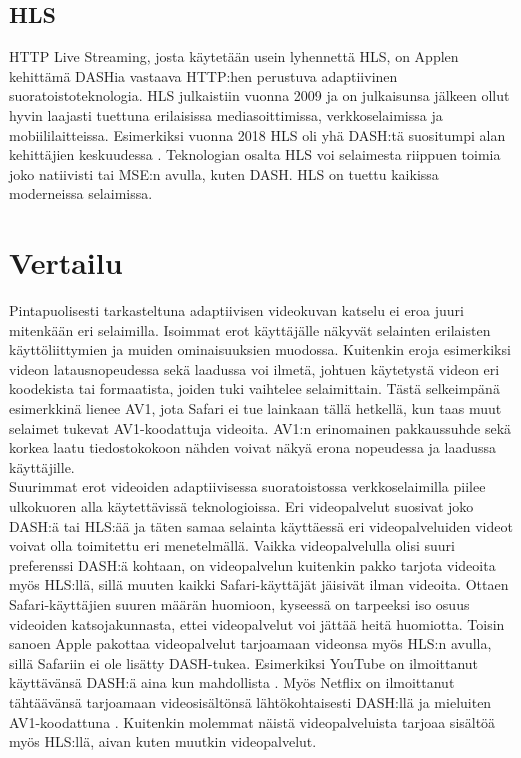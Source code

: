 \documentclass[finnish, 12pt, a4paper, elec, utf8, a-1b, online]{aaltothesis}
\begin{document}
\subsection*{HLS}

HTTP Live Streaming, josta käytetään usein lyhennettä HLS, on Applen kehittämä DASHia vastaava HTTP:hen perustuva adaptiivinen suoratoistoteknologia. HLS julkaistiin vuonna 2009 ja on julkaisunsa jälkeen ollut hyvin laajasti tuettuna erilaisissa mediasoittimissa, verkkoselaimissa ja mobiililaitteissa. Esimerkiksi vuonna 2018 HLS oli yhä DASH:tä suositumpi alan kehittäjien keskuudessa \cite{Bitmovin1}. Teknologian osalta HLS voi selaimesta riippuen toimia joko natiivisti tai MSE:n avulla, kuten DASH. HLS on tuettu kaikissa moderneissa selaimissa.

\clearpage


\section{Vertailu}

Pintapuolisesti tarkasteltuna adaptiivisen videokuvan katselu ei eroa juuri mitenkään eri selaimilla. Isoimmat erot käyttäjälle näkyvät selainten erilaisten käyttöliittymien ja muiden ominaisuuksien muodossa. Kuitenkin eroja esimerkiksi videon latausnopeudessa sekä laadussa voi ilmetä, johtuen käytetystä videon eri koodekista tai formaatista, joiden tuki vaihtelee selaimittain. Tästä selkeimpänä esimerkkinä lienee AV1, jota Safari ei tue lainkaan tällä hetkellä, kun taas muut selaimet tukevat AV1-koodattuja videoita. AV1:n erinomainen pakkaussuhde sekä korkea laatu tiedostokokoon nähden voivat näkyä erona nopeudessa ja laadussa käyttäjille. \\

\noindent Suurimmat erot videoiden adaptiivisessa suoratoistossa verkkoselaimilla piilee ulkokuoren alla käytettävissä teknologioissa. Eri videopalvelut suosivat joko DASH:ä tai HLS:ää ja täten samaa selainta käyttäessä eri videopalveluiden videot voivat olla toimitettu eri menetelmällä. Vaikka videopalvelulla olisi suuri preferenssi DASH:ä kohtaan, on videopalvelun kuitenkin pakko tarjota videoita myös HLS:llä, sillä muuten kaikki Safari-käyttäjät jäisivät ilman videoita. Ottaen Safari-käyttäjien suuren määrän huomioon, kyseessä on tarpeeksi iso osuus videoiden katsojakunnasta, ettei videopalvelut voi jättää heitä huomiotta. Toisin sanoen Apple pakottaa videopalvelut tarjoamaan videonsa myös HLS:n avulla, sillä Safariin ei ole lisätty DASH-tukea. Esimerkiksi YouTube on ilmoittanut käyttävänsä DASH:ä aina kun mahdollista \cite{Bitmovin2}. Myös Netflix on ilmoittanut tähtäävänsä tarjoamaan videosisältönsä lähtökohtaisesti DASH:llä ja mieluiten AV1-koodattuna \cite{Netflix}. Kuitenkin molemmat näistä videopalveluista tarjoaa sisältöä myös HLS:llä, aivan kuten muutkin videopalvelut. \\
\end{document}
